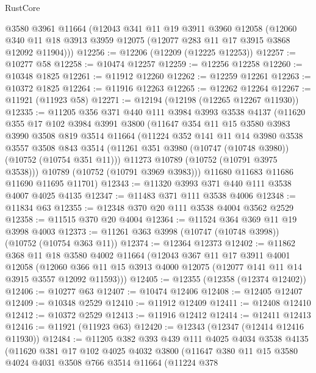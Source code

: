 \begin{lexlean}{RustCore}
\begin{coremodule}
    @3580
    @3961
    @11664
    (@12043
      @341
      @11
      @19
      @3911
      @3960
      @12058
      (@12060 @340 @11 @18 @3913 @3959 @12075 (@12077 @283 @11 @17 @3915 @3868 @12092 @11904)))
@12256 := @12206 (@12209 (@12225 @12253))
@12257 := @10277 @58
@12258 := @10474 @12257
@12259 := @12256 @12258
@12260 := @10348 @1825
@12261 := @11912 @12260
@12262 := @12259 @12261
@12263 := @10372 @1825
@12264 := @11916 @12263
@12265 := @12262 @12264
@12267 := @11921 (@11923 @58)
@12271 := @12194 (@12198 (@12265 @12267 @11930))
@12335 := @11205
    @356
    @371
    @440
    @111
    @3984
    @3993
    @3538
    @4137
    (@11620
      @355
      @17
      @102
      @3984
      @3991
      @3800
      (@11647
        @354
        @11
        @15
        @3580
        @3983
        @3990
        @3508
        @819
        @3514
        @11664
        (@11224
          @352
          @141
          @11
          @14
          @3980
          @3538
          @3557
          @3508
          @843
          @3514
          (@11261 @351 @3980 (@10747 (@10748 @3980)) (@10752 (@10754 @351 @11)))
          @11273
          @10789
          (@10752 (@10791 @3975 @3538)))
        @10789
        (@10752 (@10791 @3969 @3983)))
      @11680
      @11683
      @11686
      @11690
      @11695
      @11701)
@12343 := @11320 @3993 @371 @440 @111 @3538 @4007 @4025 @4135
@12347 := @11483 @371 @111 @3538 @4006
@12348 := @11834 @63
@12355 := @12348 @370 @20 @111 @3538 @4004 @3562 @2529
@12358 := @11515 @370 @20 @4004
@12364 := @11524 @364 @369 @11 @19 @3998 @4003
@12373 := @11261 @363 @3998 (@10747 (@10748 @3998)) (@10752 (@10754 @363 @11))
@12374 := @12364 @12373
@12402 := @11862
    @368
    @11
    @18
    @3580
    @4002
    @11664
    (@12043
      @367
      @11
      @17
      @3911
      @4001
      @12058
      (@12060 @366 @11 @15 @3913 @4000 @12075 (@12077 @141 @11 @14 @3915 @3557 @12092 @11593)))
@12405 := @12355 (@12358 (@12374 @12402))
@12406 := @10277 @63
@12407 := @10474 @12406
@12408 := @12405 @12407
@12409 := @10348 @2529
@12410 := @11912 @12409
@12411 := @12408 @12410
@12412 := @10372 @2529
@12413 := @11916 @12412
@12414 := @12411 @12413
@12416 := @11921 (@11923 @63)
@12420 := @12343 (@12347 (@12414 @12416 @11930))
@12484 := @11205
    @382
    @393
    @439
    @111
    @4025
    @4034
    @3538
    @4135
    (@11620
      @381
      @17
      @102
      @4025
      @4032
      @3800
      (@11647
        @380
        @11
        @15
        @3580
        @4024
        @4031
        @3508
        @766
        @3514
        @11664
        (@11224
          @378

\end{coremodule}
\end{lexlean}
